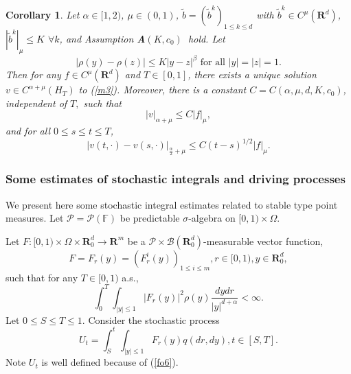 \documentclass[11pt]{amsart}
\theoremstyle{plain}
\newtheorem{corollary}{Corollary}
\numberwithin{equation}{section}
\begin{document}
\begin{corollary}
\label{lem5}Let $\alpha \in \lbrack 1,2)$, $\mu \in (0,1)$, $\tilde{b}=\left( \tilde{b}^{k}\right) _{1\leq k\leq d}$ with $\tilde{b}^{k}\in C^{\mu
}\left( \mathbf{R}^{d}\right) $, $\left\vert \tilde{b}^{k}\right\vert _{\mu
}\leq K$ $\forall k$, and Assumption \textbf{A}$(K,c_{0})$\textbf{\ }hold.
Let 
\begin{equation*}
\left\vert \rho \left( y\right) -\rho \left( z\right) \right\vert \leq
K\left\vert y-z\right\vert ^{\beta }\text{ for all }\left\vert y\right\vert
=\left\vert z\right\vert =1.
\end{equation*}Then for any $f\in C^{\mu }\left( \mathbf{R}^{d}\right) $ and $T\in \left[
0,1\right] $, there exists a unique solution $v\in C^{\alpha +\mu }\left(
H_{T}\right) $ to (\ref{m3}). Moreover, there is a constant $C=C\left(
\alpha ,\mu ,d,K,c_{0}\right) $, independent of $T,$ such that 
\begin{equation*}
\left\vert v\right\vert _{\alpha +\mu }\leq C\left\vert f\right\vert _{\mu },
\end{equation*}and for all $0\leq s\leq t\leq T$, 
\begin{equation*}
\left\vert v\left( t,\cdot \right) -v\left( s,\cdot \right) \right\vert _{\frac{\alpha }{2}+\mu }\leq C\left( t-s\right) ^{1/2}\left\vert f\right\vert
_{\mu }.
\end{equation*}
\end{corollary}

\subsubsection{Some estimates of stochastic integrals and driving processes}

We present here some stochastic integral estimates related to stable type
point measures. Let $\mathcal{P=P}\left( \mathbb{F}\right) $ be predictable $\sigma $-algebra on $[0,1)\times \Omega .$

Let $F:[0,1)\times \Omega \times \mathbf{R}_{0}^{d}\rightarrow \mathbf{R}^{m} $ be a $\mathcal{P\times B}\left( \mathbf{R}_{0}^{d}\right) $-measurable vector function, 
\begin{equation*}
F=F_{r}\left( y\right) =\left( F_{r}^{i}\left( y\right) \right) _{1\leq
i\leq m},r\in \lbrack 0,1),y\in \mathbf{R}_{0}^{d},
\end{equation*}such that for any $T\in \lbrack 0,1)$ a.s.,\begin{equation}
\int_{0}^{T}\int_{\left\vert y\right\vert \leq 1}\left\vert F_{r}\left(
y\right) \right\vert ^{2}\rho \left( y\right) \frac{dydr}{\left\vert
y\right\vert ^{d+\alpha }}<\infty .  \label{fo6}
\end{equation}Let $0\leq S\leq T\leq 1.$ Consider the stochastic process 
\begin{equation*}
U_{t}=\int_{S}^{t}\int_{\left\vert y\right\vert \leq 1}F_{r}\left( y\right)
q\left( dr,dy\right) ,t\in \left[ S,T\right] .
\end{equation*}Note $U_{t}$ is well defined because of (\ref{fo6}).
\end{document}
